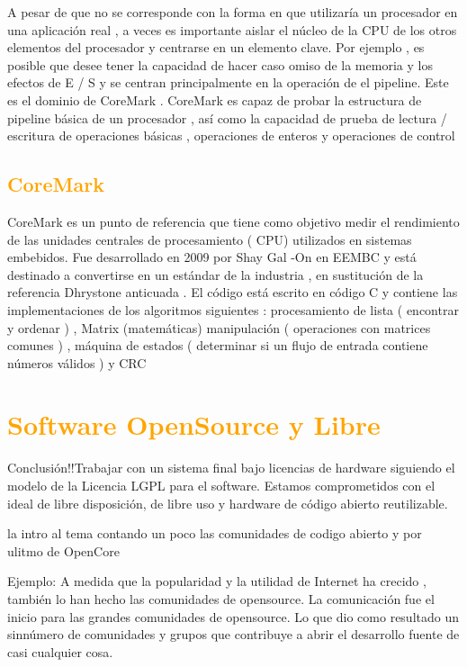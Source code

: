 \documentclass[a4paper,11pt]{article}
\begin{document}
A pesar de que no se corresponde con la forma en que utilizaría un procesador en una aplicación real , a veces es importante aislar el núcleo de la CPU de los otros elementos del procesador y centrarse en un elemento clave. Por ejemplo , es posible que desee tener la capacidad de hacer caso omiso de la memoria y los efectos de E / S y se centran principalmente en la operación de el pipeline. Este es el dominio de CoreMark . CoreMark es capaz de probar la estructura de pipeline básica de un procesador , así como la capacidad de prueba de lectura / escritura de operaciones básicas , operaciones de enteros y operaciones de control

	\subsection{\textcolor{orange}{CoreMark}}

CoreMark es un punto de referencia que tiene como objetivo medir el rendimiento de las unidades centrales de procesamiento ( CPU) utilizados en sistemas embebidos. Fue desarrollado en 2009 por Shay Gal -On en EEMBC y está destinado a convertirse en un estándar de la industria , en sustitución de la referencia Dhrystone anticuada . El código está escrito en código C y contiene las implementaciones de los algoritmos siguientes : procesamiento de lista ( encontrar y ordenar ) , Matrix (matemáticas) manipulación ( operaciones con matrices comunes ) , máquina de estados ( determinar si un flujo de entrada contiene números válidos ) y CRC


\section{\textcolor{orange}{Software OpenSource y Libre}}%

Conclusión!!Trabajar con un sistema final bajo licencias de hardware siguiendo el modelo de la Licencia LGPL para el software. Estamos comprometidos con el ideal de libre disposición, de libre uso y hardware de código abierto reutilizable.

la intro al tema contando un poco  las comunidades de codigo abierto y por ulitmo de OpenCore

Ejemplo: 
A medida que la popularidad y la utilidad de Internet ha crecido , también lo han hecho las comunidades de opensource.
La comunicación fue el inicio para las grandes comunidades de opensource. Lo que  dio como resultado un sinnúmero de comunidades y grupos que contribuye a abrir el desarrollo fuente de casi cualquier cosa.
\end{document}
